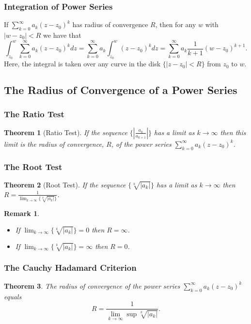 \documentclass{article}
\newtheorem{theorem}{Theorem}[section]
\newtheorem*{remark}{Remark}
\begin{document}
\subsubsection{Integration of Power Series}
If $\sum_{k=0}^{\infty}a_k(z - z_0)^k$ has radius of convergence $R$, then for any $w$ with $\left|w - z_0\right| < R$ we have that
\begin{equation*}
\int_{z_0}^{w} \sum_{k=0}^{\infty}a_k(z - z_0)^kdz = \sum_{k=0}^{\infty}a_k \int_{z_0}^{w} (z - z_0)^k dz = \sum_{k=0}^{\infty} a_k \frac{1}{k+1}(w - z_0)^{k+1}.
\end{equation*}
Here, the integral is taken over any curve in the disk $\{\left|z - z_0\right| < R \}$ from $z_0$ to $w$.

\subsection{The Radius of Convergence of a Power Series}

\subsubsection{The Ratio Test}
\begin{theorem}[Ratio Test]
If the sequence $\{ \left| \frac{a_k}{a_{k+1}}\right| \}$ has a limit as $k \to \infty$ then this limit is the radius of convergence, $R$, of the power series $\sum_{k=0}^{\infty}a_k(z-z_0)^k$.
\end{theorem}

\subsubsection{The Root Test}
\begin{theorem}[Root Test]
If the sequence $\{\sqrt[k]{\left|a_k\right|}\}$ has a limit as $k \to \infty$ then $R = \frac{1}{\lim_{k\to \infty}\{\sqrt[k]{\left|a_k\right|}\}}$.
\end{theorem}
\begin{remark}
\begin{itemize}
\item If $\lim_{k \to \infty} \{\sqrt[k]{\left|a_k\right|}\} = 0$ then $R = \infty$.
\item If $\lim_{k \to \infty} \{\sqrt[k]{\left|a_k\right|}\} = \infty$ then $R = 0$.
\end{itemize}
\end{remark}

\subsubsection{The Cauchy Hadamard Criterion}
\begin{theorem}
The radius of convergence of the power series $\sum_{k=0}^{\infty}a_k(z-z_0)^k$ equals
\begin{equation*}
R = \frac{1}{\lim_{k \to \infty} \sup \sqrt[k]{\left|a_k\right|}}.
\end{equation*}
\end{theorem}
\end{document}
